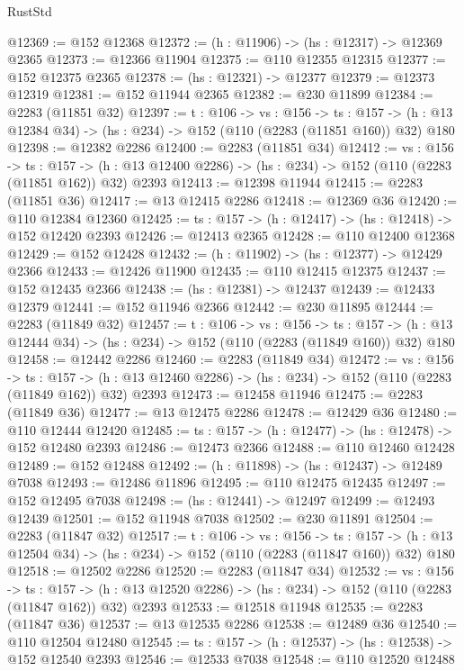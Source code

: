 \begin{lexlean}{RustStd}
\begin{coremodule}
@12369 := @152 @12368
@12372 := (h : @11906) -> (hs : @12317) -> @12369 @2365
@12373 := @12366 @11904
@12375 := @110 @12355 @12315
@12377 := @152 @12375 @2365
@12378 := (hs : @12321) -> @12377
@12379 := @12373 @12319
@12381 := @152 @11944 @2365
@12382 := @230 @11899
@12384 := @2283 (@11851 @32)
@12397 := {t : @106} ->
  {vs : @156} ->
  {ts : @157} -> (h : @13 @12384 @34) -> (hs : @234) -> @152 (@110 (@2283 (@11851 @160)) @32) @180
@12398 := @12382 @2286
@12400 := @2283 (@11851 @34)
@12412 := {vs : @156} ->
  {ts : @157} ->
  (h : @13 @12400 @2286) -> (hs : @234) -> @152 (@110 (@2283 (@11851 @162)) @32) @2393
@12413 := @12398 @11944
@12415 := @2283 (@11851 @36)
@12417 := @13 @12415 @2286
@12418 := @12369 @36
@12420 := @110 @12384 @12360
@12425 := {ts : @157} -> (h : @12417) -> (hs : @12418) -> @152 @12420 @2393
@12426 := @12413 @2365
@12428 := @110 @12400 @12368
@12429 := @152 @12428
@12432 := (h : @11902) -> (hs : @12377) -> @12429 @2366
@12433 := @12426 @11900
@12435 := @110 @12415 @12375
@12437 := @152 @12435 @2366
@12438 := (hs : @12381) -> @12437
@12439 := @12433 @12379
@12441 := @152 @11946 @2366
@12442 := @230 @11895
@12444 := @2283 (@11849 @32)
@12457 := {t : @106} ->
  {vs : @156} ->
  {ts : @157} -> (h : @13 @12444 @34) -> (hs : @234) -> @152 (@110 (@2283 (@11849 @160)) @32) @180
@12458 := @12442 @2286
@12460 := @2283 (@11849 @34)
@12472 := {vs : @156} ->
  {ts : @157} ->
  (h : @13 @12460 @2286) -> (hs : @234) -> @152 (@110 (@2283 (@11849 @162)) @32) @2393
@12473 := @12458 @11946
@12475 := @2283 (@11849 @36)
@12477 := @13 @12475 @2286
@12478 := @12429 @36
@12480 := @110 @12444 @12420
@12485 := {ts : @157} -> (h : @12477) -> (hs : @12478) -> @152 @12480 @2393
@12486 := @12473 @2366
@12488 := @110 @12460 @12428
@12489 := @152 @12488
@12492 := (h : @11898) -> (hs : @12437) -> @12489 @7038
@12493 := @12486 @11896
@12495 := @110 @12475 @12435
@12497 := @152 @12495 @7038
@12498 := (hs : @12441) -> @12497
@12499 := @12493 @12439
@12501 := @152 @11948 @7038
@12502 := @230 @11891
@12504 := @2283 (@11847 @32)
@12517 := {t : @106} ->
  {vs : @156} ->
  {ts : @157} -> (h : @13 @12504 @34) -> (hs : @234) -> @152 (@110 (@2283 (@11847 @160)) @32) @180
@12518 := @12502 @2286
@12520 := @2283 (@11847 @34)
@12532 := {vs : @156} ->
  {ts : @157} ->
  (h : @13 @12520 @2286) -> (hs : @234) -> @152 (@110 (@2283 (@11847 @162)) @32) @2393
@12533 := @12518 @11948
@12535 := @2283 (@11847 @36)
@12537 := @13 @12535 @2286
@12538 := @12489 @36
@12540 := @110 @12504 @12480
@12545 := {ts : @157} -> (h : @12537) -> (hs : @12538) -> @152 @12540 @2393
@12546 := @12533 @7038
@12548 := @110 @12520 @12488

\end{coremodule}
\end{lexlean}
